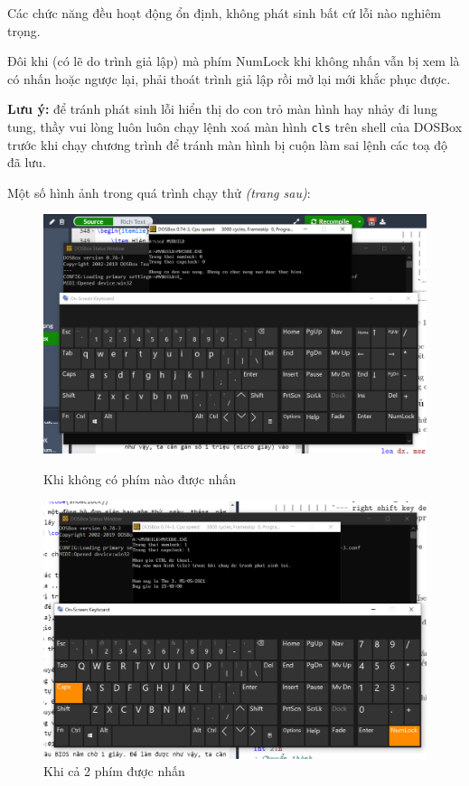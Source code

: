 \documentclass[12pt, final]{article}
\newcommand{\code}[1]{\texttt{#1}}
\begin{document}
Các chức năng đều hoạt động ổn định, không phát sinh bất cứ lỗi nào nghiêm trọng.

Đôi khi (có lẽ do trình giả lập) mà phím NumLock khi không nhấn vẫn bị xem là có nhấn hoặc ngược lại, phải thoát trình giả lập rồi mở lại mới khắc phục được.

\textbf{Lưu ý:} để tránh phát sinh lỗi hiển thị do con trỏ màn hình hay nhảy đi lung tung, thầy vui lòng luôn luôn chạy lệnh xoá màn hình \code{cls} trên shell của DOSBox trước khi chạy chương trình để tránh màn hình bị cuộn làm sai lệnh các toạ độ đã lưu.

Một số hình ảnh trong quá trình chạy thử \textit{(trang sau)}:

\begin{figure}[H]
\centering
\includegraphics[width=\textwidth]{image/no-key.png}
\caption{Khi không có phím nào được nhấn}
\includegraphics[width=\textwidth]{image/caps-num.png}
\caption{Khi cả 2 phím được nhấn}
\end{figure}
\end{document}

